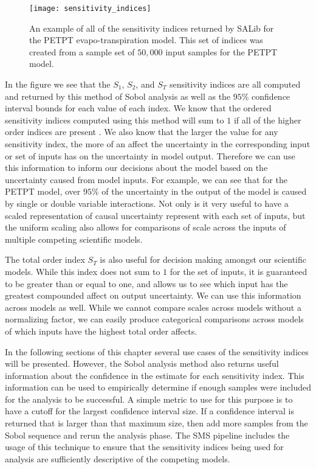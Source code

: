 \FloatBarrier
\begin{figure}[!htbp]
    \label{sens_idxs}
    \centering
    \texttt{[image: sensitivity\_indices]}%
    \caption[PETPT Sensitivity Indices]{An example of all of the sensitivity indices returned by SALib for the PETPT evapo-transpiration model. This set of indices was created from a sample set of $50,000$ input samples for the PETPT model.}
\end{figure}
\FloatBarrier

In the figure we see that the $S_1$, $S_2$, and $S_T$ sensitivity indices are all computed and returned by this method of Sobol analysis as well as the $95\%$ confidence interval bounds for each value of each index.
We know that the ordered sensitivity indices computed using this method will sum to $1$ if all of the higher order indices are present \citep{sobol2001globalSA}.
We also know that the larger the value for any sensitivity index, the more of an affect the uncertainty in the corresponding input or set of inputs has on the uncertainty in model output.
Therefore we can use this information to inform our decisions about the model based on the uncertainty caused from model inputs.
For example, we can see that for the PETPT model, over $95\%$ of the uncertainty in the output of the model is caused by single or double variable interactions.
Not only is it very useful to have a scaled representation of causal uncertainty represent with each set of inputs, but the uniform scaling also allows for comparisons of scale across the inputs of multiple competing scientific models.

The total order index $S_T$ is also useful for decision making amongst our scientific models.
While this index does not sum to $1$ for the set of inputs, it is guaranteed to be greater than or equal to one, and allows us to see which input has the greatest compounded affect on output uncertainty.
We can use this information across models as well.
While we cannot compare scales across models without a normalizing factor, we can easily produce categorical comparisons across models of which inputs have the highest total order affects.

In the following sections of this chapter several use cases of the sensitivity indices will be presented.
However, the Sobol analysis method also returns useful information about the confidence in the estimate for each sensitivity index.
This information can be used to empirically determine if enough samples were included for the analysis to be successful.
A simple metric to use for this purpose is to have a cutoff for the largest confidence interval size.
If a confidence interval is returned that is larger than that maximum size, then add more samples from the Sobol sequence and rerun the analysis phase.
The SMS pipeline includes the usage of this technique to ensure that the sensitivity indices being used for analysis are sufficiently descriptive of the competing models.

